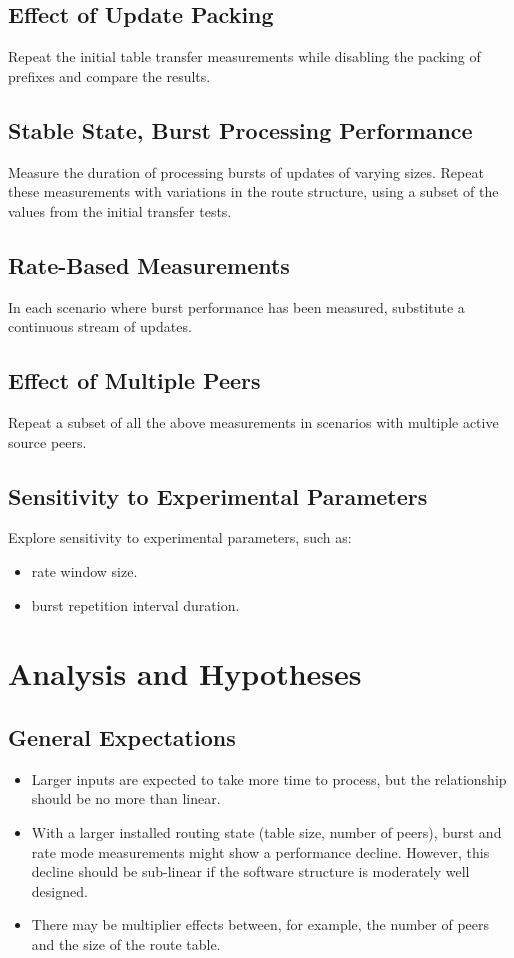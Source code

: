 \subsection{Effect of Update Packing}
Repeat the initial table transfer measurements while disabling the packing of prefixes and compare the results.

\subsection{Stable State, Burst Processing Performance}
Measure the duration of processing bursts of updates of varying sizes. Repeat these measurements with variations in the route structure, using a subset of the values from the initial transfer tests.

\subsection{Rate-Based Measurements}
In each scenario where burst performance has been measured, substitute a continuous stream of updates.

\subsection{Effect of Multiple Peers}
Repeat a subset of all the above measurements in scenarios with multiple active source peers.

\subsection{Sensitivity to Experimental Parameters}
Explore sensitivity to experimental parameters, such as:
\begin{itemize}
    \item rate window size.
    \item burst repetition interval duration.
\end{itemize}

\section{Analysis and Hypotheses}

\subsection{General Expectations}
\begin{itemize}
    \item Larger inputs are expected to take more time to process, but the relationship should be no more than linear.
    \item With a larger installed routing state (table size, number of peers), burst and rate mode measurements might show a performance decline. However, this decline should be sub-linear if the software structure is moderately well designed.
    \item There may be multiplier effects between, for example, the number of peers and the size of the route table.
\end{itemize}

